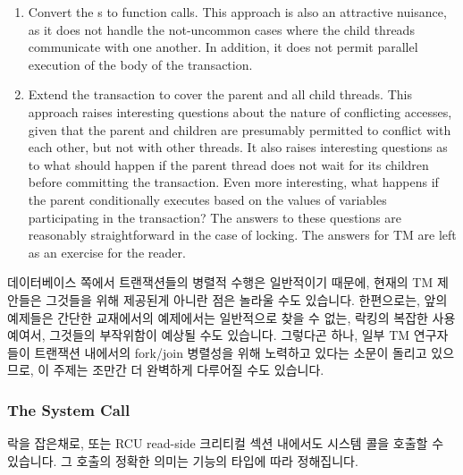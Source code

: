 \begin{enumerate}
\item	Convert the s to function calls.
	This approach is also an attractive nuisance, as it does not
	handle the not-uncommon cases where the child threads communicate
	with one another.
	In addition, it does not permit parallel execution of the body
	of the transaction.
\item	Extend the transaction to cover the parent and all child threads.
	This approach raises interesting questions about the nature of
	conflicting accesses, given that the parent and children are
	presumably permitted to conflict with each other, but not with
	other threads.
	It also raises interesting questions as to what should happen
	if the parent thread does not wait for its children before
	committing the transaction.
	Even more interesting, what happens if the parent conditionally
	executes  based on the values of variables
	participating in the transaction?
	The answers to these questions are reasonably straightforward
	in the case of locking.
	The answers for TM are left as an exercise for the reader.
\fi
\end{enumerate}

데이터베이스 쪽에서 트랜잭션들의 병렬적 수행은 일반적이기 때문에, 현재의 TM
제안들은 그것들을 위해 제공된게 아니란 점은 놀라울 수도 있습니다.
한편으로는, 앞의 예제들은 간단한 교재에서의 예제에서는 일반적으로 찾을 수 없는,
락킹의 복잡한 사용 예여서, 그것들의 부작위함이 예상될 수도 있습니다.
그렇다곤 하나, 일부 TM 연구자들이 트랜잭션 내에서의 fork/join 병렬성을 위해
노력하고 있다는 소문이 돌리고 있으므로, 이 주제는 조만간 더 완벽하게 다루어질
수도 있습니다.

\subsubsection{The  System Call}
\label{sec:future:The exec System Call}

락을 잡은채로, 또는 RCU read-side 크리티컬 섹션 내에서도  시스템
콜을 호출할 수 있습니다.
그 호출의 정확한 의미는 기능의 타입에 따라 정해집니다.

